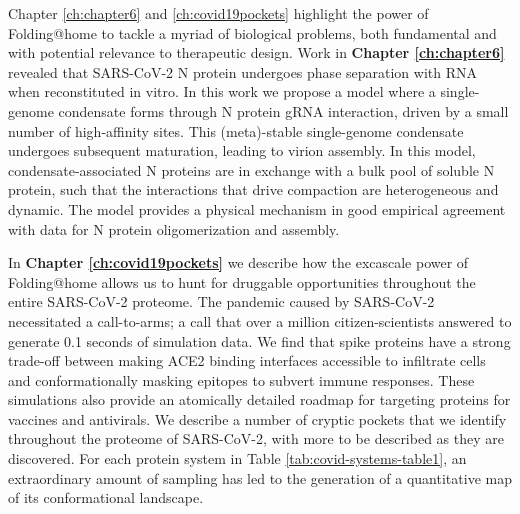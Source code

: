 \documentclass[../main.tex]{subfiles}
\begin{document}
        Chapter \ref{ch:chapter6} and \ref{ch:covid19pockets} highlight the power of Folding@home to tackle a myriad of biological problems, both fundamental and with potential relevance to therapeutic design. Work in \textbf{Chapter \ref{ch:chapter6}} revealed that SARS-CoV-2 N protein undergoes phase separation with RNA when reconstituted in vitro. In this work we propose a model where a single-genome condensate forms through N protein gRNA interaction, driven by a small number of high-affinity sites. This (meta)-stable single-genome condensate undergoes subsequent maturation, leading to virion assembly. In this model, condensate-associated N proteins are in exchange with a bulk pool of soluble N protein, such that the interactions that drive compaction are heterogeneous and dynamic. The model provides a physical mechanism in good empirical agreement with data for N protein oligomerization and assembly.

        In \textbf{Chapter \ref{ch:covid19pockets}} we describe how the excascale power of Folding@home allows us to hunt for druggable opportunities throughout the entire SARS-CoV-2 proteome. The pandemic caused by SARS-CoV-2 necessitated a call-to-arms; a call that over a million citizen-scientists answered to generate 0.1 seconds of simulation data. We find that spike proteins have a strong trade-off between making ACE2 binding interfaces accessible to infiltrate cells and conformationally masking epitopes to subvert immune responses. These simulations also provide an atomically detailed roadmap for targeting proteins for vaccines and antivirals. We describe a number of cryptic pockets that we identify throughout the proteome of SARS-CoV-2, with more to be described as they are discovered. For each protein system in Table \ref{tab:covid-systems-table1}, an extraordinary amount of sampling has led to the generation of a quantitative map of its conformational landscape. 
\end{document}
